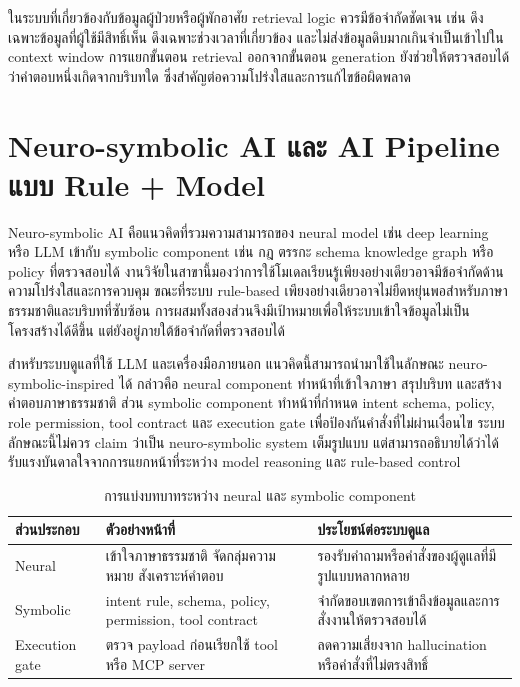 ในระบบที่เกี่ยวข้องกับข้อมูลผู้ป่วยหรือผู้พักอาศัย retrieval logic ควรมีข้อจำกัดชัดเจน เช่น ดึงเฉพาะข้อมูลที่ผู้ใช้มีสิทธิ์เห็น ดึงเฉพาะช่วงเวลาที่เกี่ยวข้อง และไม่ส่งข้อมูลดิบมากเกินจำเป็นเข้าไปใน context window การแยกขั้นตอน retrieval ออกจากขั้นตอน generation ยังช่วยให้ตรวจสอบได้ว่าคำตอบหนึ่งเกิดจากบริบทใด ซึ่งสำคัญต่อความโปร่งใสและการแก้ไขข้อผิดพลาด

\section{Neuro-symbolic AI และ AI Pipeline แบบ Rule + Model}
\label{sec:ch2_neuro_symbolic_pipeline}

Neuro-symbolic AI คือแนวคิดที่รวมความสามารถของ neural model เช่น deep learning หรือ LLM เข้ากับ symbolic component เช่น กฎ ตรรกะ schema knowledge graph หรือ policy ที่ตรวจสอบได้ งานวิจัยในสาขานี้มองว่าการใช้โมเดลเรียนรู้เพียงอย่างเดียวอาจมีข้อจำกัดด้านความโปร่งใสและการควบคุม ขณะที่ระบบ rule-based เพียงอย่างเดียวอาจไม่ยืดหยุ่นพอสำหรับภาษาธรรมชาติและบริบทที่ซับซ้อน การผสมทั้งสองส่วนจึงมีเป้าหมายเพื่อให้ระบบเข้าใจข้อมูลไม่เป็นโครงสร้างได้ดีขึ้น แต่ยังอยู่ภายใต้ข้อจำกัดที่ตรวจสอบได้ \cite{Susskind2021NeuroSymbolic,ColeloughRegli2025NeuroSymbolic}

สำหรับระบบดูแลที่ใช้ LLM และเครื่องมือภายนอก แนวคิดนี้สามารถนำมาใช้ในลักษณะ neuro-symbolic-inspired ได้ กล่าวคือ neural component ทำหน้าที่เข้าใจภาษา สรุปบริบท และสร้างคำตอบภาษาธรรมชาติ ส่วน symbolic component ทำหน้าที่กำหนด intent schema, policy, role permission, tool contract และ execution gate เพื่อป้องกันคำสั่งที่ไม่ผ่านเงื่อนไข ระบบลักษณะนี้ไม่ควร claim ว่าเป็น neuro-symbolic system เต็มรูปแบบ แต่สามารถอธิบายได้ว่าได้รับแรงบันดาลใจจากการแยกหน้าที่ระหว่าง model reasoning และ rule-based control

\begin{table}[htbp]
    \centering
    \caption{การแบ่งบทบาทระหว่าง neural และ symbolic component}
    \label{tab:ch2_neuro_symbolic_roles}
    \small
    \begin{tabular}{>{\raggedright\arraybackslash}p{}
                    >{\raggedright\arraybackslash}p{}
                    >{\raggedright\arraybackslash}p{}}
        \toprule
        ส่วนประกอบ & ตัวอย่างหน้าที่ & ประโยชน์ต่อระบบดูแล \\ \midrule
        Neural & เข้าใจภาษาธรรมชาติ จัดกลุ่มความหมาย สังเคราะห์คำตอบ & รองรับคำถามหรือคำสั่งของผู้ดูแลที่มีรูปแบบหลากหลาย \\ \midrule
        Symbolic & intent rule, schema, policy, permission, tool contract & จำกัดขอบเขตการเข้าถึงข้อมูลและการสั่งงานให้ตรวจสอบได้ \\ \midrule
        Execution gate & ตรวจ payload ก่อนเรียกใช้ tool หรือ MCP server & ลดความเสี่ยงจาก hallucination หรือคำสั่งที่ไม่ตรงสิทธิ์ \\ \bottomrule
    \end{tabular}
\end{table}

